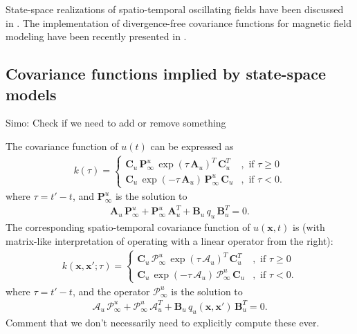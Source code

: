 \documentclass[journal]{IEEEtran}
\newcommand{\simo}[1]{{\color{red}#1}}
\begin{document}
State-space realizations of spatio-temporal oscillating fields have been discussed in \cite{Solin+Sarkka:2013}. The implementation of divergence-free covariance functions for magnetic field modeling have been recently presented in \cite{Solin:2015}.


\subsection{Covariance functions implied by state-space models}
%
\simo{Simo: Check if we need to add or remove something}

The covariance function of $u(t)$ can be expressed as
%
\begin{equation}
\begin{split}
  k(\tau) = \begin{cases}
    \mathbf{C}_u \, \mathbf{P}^u_\infty \, \exp(\tau \, \mathbf{A}_u)^T \, \mathbf{C}_u^T &,
    \text{ if } \tau \ge 0 \\
    \mathbf{C}_u \, \exp(-\tau \, \mathbf{A}_u) \, \mathbf{P}^u_\infty \, \mathbf{C}_u &,
    \text{ if } \tau < 0.
  \end{cases}
\end{split}
\end{equation}
%
where $\tau = t' - t$, and $\mathbf{P}^u_\infty$ is the solution to
%
\begin{equation}
\begin{split}
  \mathbf{A}_u \, \mathbf{P}^u_\infty + \mathbf{P}^u_\infty \, \mathbf{A}_u^T
  + \mathbf{B}_u \, q_u \, \mathbf{B}_u^T = 0.
\end{split}
\end{equation}
%
The corresponding spatio-temporal covariance function of $u(\mathbf{x},t)$ is (with matrix-like interpretation of operating with a linear operator from the right):
%
\begin{equation}
\begin{split}
  k(\mathbf{x},\mathbf{x}';\tau) = \begin{cases}
    \mathbf{C}_u \, \mathcal{P}^u_\infty \, \exp(\tau \, \mathcal{A}_u)^T \, \mathbf{C}_u^T &,
    \text{ if } \tau \ge 0 \\
    \mathbf{C}_u \, \exp(-\tau \, \mathcal{A}_u) \, \mathcal{P}^u_\infty \, \mathbf{C}_u &,
    \text{ if } \tau < 0.
  \end{cases}
\end{split}
\end{equation}
%
where $\tau = t' - t$, and the operator $\mathcal{P}^u_\infty$ is the solution to
%
\begin{equation}
\begin{split}
  \mathcal{A}_u \, \mathcal{P}^u_\infty + \mathcal{P}^u_\infty \, \mathcal{A}_u^T
  + \mathbf{B}_u \, q_u(\mathbf{x},\mathbf{x}') \, \mathbf{B}_u^T = 0.
\end{split}
\end{equation}
%
\simo{Comment that we don't necessarily need to explicitly compute these ever.}
\end{document}

